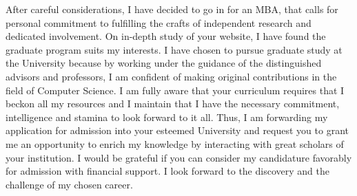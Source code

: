 \documentclass[letterpaper]{article}
\begin{document}
After careful considerations, I have decided to go in for an MBA, that calls for personal commitment to 
fulfilling the crafts of independent research and dedicated involvement.
On in-depth study of your website, I have found the graduate program suits my interests.
I have chosen to pursue graduate study at the University because by working under the guidance of the 
distinguished advisors and professors, I am confident of making original contributions in the field of Computer Science. 
I am fully aware that your curriculum requires that I beckon all my resources and 
I maintain that I have the necessary commitment, intelligence and stamina to look forward to it all. 
Thus, I am forwarding my application for admission into your esteemed University and request you to grant me 
an opportunity to enrich my knowledge by interacting with great scholars of your institution. 
I would be grateful if you can consider my candidature favorably for admission with financial support. 
I look forward to the discovery and the challenge of my chosen career.
\end{document}
